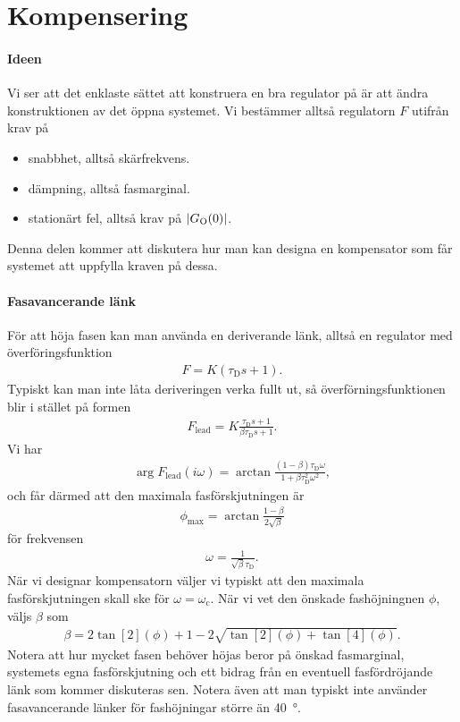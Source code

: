 \section{Kompensering}

\paragraph{Ideen}
Vi ser att det enklaste sättet att konstruera en bra regulator på är att ändra konstruktionen av det öppna systemet. Vi bestämmer alltså regulatorn $F$ utifrån krav på
\begin{itemize}
	\item snabbhet, alltså skärfrekvens.
	\item dämpning, alltså fasmarginal.
	\item stationärt fel, alltså krav på $\abs{G_{\text{O}}(0)}$.
\end{itemize}
Denna delen kommer att diskutera hur man kan designa en kompensator som får systemet att uppfylla kraven på dessa.

\paragraph{Fasavancerande länk}
För att höja fasen kan man använda en deriverande länk, alltså en regulator med överföringsfunktion
\begin{align*}
	F = K(\tau_{\text{D}}s + 1).
\end{align*}
Typiskt kan man inte låta deriveringen verka fullt ut, så överförningsfunktionen blir i stället på formen
\begin{align*}
	F_{\text{lead}} = K\frac{\tau_{\text{D}}s + 1}{\beta\tau_{\text{D}}s + 1}.
\end{align*}
Vi har
\begin{align*}
	\arg{F_{\text{lead}}(i\omega)} = \arctan{\frac{(1 - \beta)\tau_{\text{D}}\omega}{1 + \beta\tau_{\text{D}}^{2}\omega^{2}}},
\end{align*}
och får därmed att den maximala fasförskjutningen är
\begin{align*}
	\phi_{\text{max}} = \arctan{\frac{1 - \beta}{2\sqrt{\beta}}}
\end{align*}
för frekvensen
\begin{align*}
	\omega = \frac{1}{\sqrt{\beta}\tau_{\text{D}}}.
\end{align*}
När vi designar kompensatorn väljer vi typiskt att den maximala fasförskjutningen skall ske för $\omega = \omega_{\text{c}}$. När vi vet den önskade fashöjningnen $\phi$, väljs $\beta$ som
\begin{align*}
	\beta = 2\tan[2](\phi) + 1 - 2\sqrt{\tan[2](\phi) + \tan[4](\phi)}.
\end{align*}
Notera att hur mycket fasen behöver höjas beror på önskad fasmarginal, systemets egna fasförskjutning och ett bidrag från en eventuell fasfördröjande länk som kommer diskuteras sen. Notera även att man typiskt inte använder fasavancerande länker för fashöjningar större än \SI{40}{\degree}.

